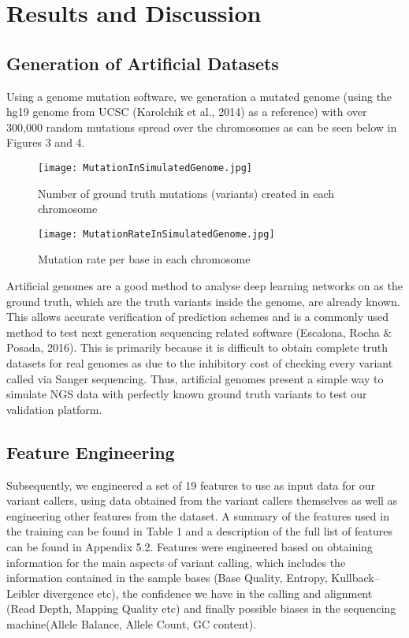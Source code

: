 \documentclass{article}
\begin{document}
\newpage
\section{Results and Discussion}
\subsection{Generation of Artificial Datasets}
Using a genome mutation software, we generation a mutated genome (using the hg19 genome from UCSC (Karolchik et al., 2014) as a reference) with over 300,000 random mutations spread over the chromosomes as can be seen below in Figures 3 and 4. 

\begin{figure}[H]
\centering
\texttt{[image: MutationInSimulatedGenome.jpg]}
\caption{Number of ground truth mutations (variants) created in each chromosome }
\end{figure}

\begin{figure}[H]
\centering
\texttt{[image: MutationRateInSimulatedGenome.jpg]}
\caption{Mutation rate per base in each chromosome}
\end{figure}

Artificial genomes are a good method to analyse deep learning networks on as the ground truth, which are the truth variants inside the genome, are already known. This allows accurate verification of prediction schemes and is a commonly used method to test next generation sequencing related software (Escalona, Rocha \& Posada, 2016). This is primarily because it is difficult to obtain complete truth datasets for real genomes as due to the inhibitory cost of checking every variant called via Sanger sequencing. Thus, artificial genomes present a simple way to simulate NGS data with perfectly known ground truth variants to test our validation platform.

\subsection{Feature Engineering}
Subsequently, we engineered a set of 19 features to use as input data for our variant callers, using data obtained from the variant callers themselves as well as engineering other features from the dataset. A summary of the features used in the training can be found in Table 1 and a description of the full list of features can be found in Appendix 5.2. Features were engineered based on obtaining information for the main aspects of variant calling, which includes the information contained in the sample bases (Base Quality, Entropy, Kullback–Leibler divergence etc), the confidence we have in the calling and alignment (Read Depth, Mapping Quality etc) and finally possible biases in the sequencing machine(Allele Balance, Allele Count, GC content).
\end{document}
